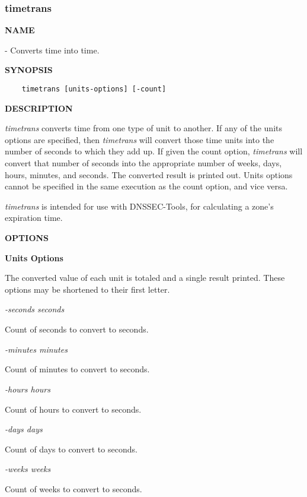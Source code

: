 \clearpage

\subsubsection{\bf timetrans}

{\bf NAME}

 - Converts time into time.

{\bf SYNOPSIS}

\begin{verbatim}
    timetrans [units-options] [-count]
\end{verbatim}

{\bf DESCRIPTION}

{\it timetrans} converts time from one type of unit to another.  If any of the
units options are specified, then {\it timetrans} will convert those time units
into the number of seconds to which they add up.  If given the count option,
{\it timetrans} will convert that number of seconds into the appropriate number
of weeks, days, hours, minutes, and seconds.  The converted result is printed
out.  Units options cannot be specified in the same execution as the count
option, and vice versa.

{\it timetrans} is intended for use with DNSSEC-Tools, for calculating
a zone's expiration time.

{\bf OPTIONS}

{\bf Units Options}

The converted value of each unit is totaled and a single result printed.
These options may be shortened to their first letter.

\begin{description}

\item {\it -seconds seconds}\verb" "

Count of seconds to convert to seconds.

\item {\it -minutes minutes}\verb" "

Count of minutes to convert to seconds.

\item {\it -hours hours}\verb" "

Count of hours to convert to seconds.

\item {\it -days days}\verb" "

Count of days to convert to seconds.

\item {\it -weeks weeks}\verb" "

Count of weeks to convert to seconds.

\end{description}

